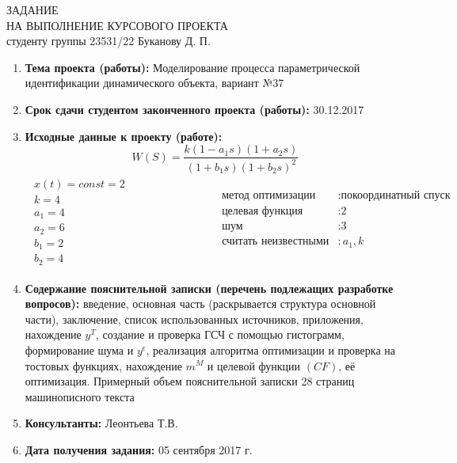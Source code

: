 \documentclass[a4paper, 12pt]{article}
\begin{document}
\newpage
\thispagestyle{empty}
\begin{center}
    ЗАДАНИЕ\\
    НА ВЫПОЛНЕНИЕ КУРСОВОГО ПРОЕКТА \\[1ex]
    студенту группы 23531/22 Буканову Д. П.
\end{center}

\vspace{0.5cm}

\begin{enumerate}
    \item
        \textbf{Тема проекта (работы):} Моделирование процесса параметрической идентификации динамического объекта, вариант №37
    \item
        \textbf{Срок сдачи студентом законченного проекта (работы):} 30.12.2017
    \item
        \textbf{Исходные данные к проекту (работе):}
            $$
                W(S) = \frac{k(1-a_1s)(1+a_2s)}{(1+b_1s)(1+b_2s)^2}
            $$
            $$
                \begin{matrix}
                    \begin{aligned}
                        x(t) = const = 2 \\
                        k = 4 \\
                        a_1 = 4 \\
                        a_2 = 6 \\
                        b_1 = 2 \\
                        b_2 = 4
                    \end{aligned}
                    &
                    \hspace{3cm}
                    \begin{aligned}
                        \text{метод оптимизации}&: \text{покоординатный спуск} \\
                        \text{целевая функция}&: \text{2} \\
                        \text{шум}&: \text{3} \\
                        \text{считать неизвестными}&: \text{$a_1, k$} \\
                    \end{aligned}
                \end{matrix}
            $$
    \item
        \textbf{Содержание пояснительной записки (перечень подлежащих разработке вопросов):} введение, основная часть (раскрывается структура основной части), заключение, список использованных источников, приложения, нахождение $y^T$, создание и проверка ГСЧ с помощью гистограмм, формирование шума и $y^\epsilon$, реализация алгоритма оптимизации и проверка на тостовых функциях, нахождение $m^M$ и целевой функции $(CF)$, её оптимизация. Примерный объем пояснительной записки 28 страниц машинописного текста
    \item
        \textbf{Консультанты:} Леонтьева Т.В.
    \item
        \textbf{Дата получения задания:} 05 сентября 2017 г.
\end{enumerate}
\end{document}
